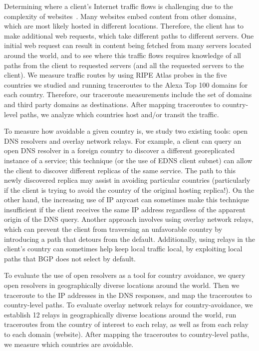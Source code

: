 Determining where a client's Internet traffic flows is challenging due to the
 complexity of websites~\cite{butkiewicz2011understanding}.  Many
websites embed content from other domains, which are most likely
hosted in different locations.  Therefore, the client has to make
additional web requests, which take different paths to different servers.  One initial web
request can result in content being fetched from many servers located
around the world, and to see where this traffic flows requires knowledge
of all paths from the client to requested servers (and all the requested
servers to the client).  We measure traffic routes by using RIPE 
Atlas probes in the five countries we studied and running traceroutes to 
the Alexa Top 100 domains for each country.  Therefore, our traceroute measurements include the 
set of domains and third party domains as destinations.  After mapping 
traceroutes to country-level paths, we analyze which 
countries host and/or transit the traffic.

To measure how avoidable a given country is, we study two existing tools: open DNS resolvers 
and overlay network relays. For
example, a client can query an open DNS resolver in a foreign country to
discover a different georeplicated instance of a service; this technique
(or the use of EDNS client subnet) can allow the client to discover
different replicas of the same service. The path to this newly
discovered replica may assist in avoiding particular countries
(particularly if the client is trying to avoid the country of the
original hosting replica!).  On the other hand, the increasing use of IP anycast \cite{cicalese2015characterizing} can
sometimes make this technique insufficient if the client
receives the same IP address regardless of the apparent origin of the
DNS query.  Another approach involves using overlay network relays, which can
prevent the client from traversing an unfavorable country by introducing
a path that detours from the default. Additionally, using
relays in the client's country can sometimes help keep local traffic
local, by exploiting local paths that BGP does not select by default.

To evaluate the use of open resolvers as a tool for country avoidance, we
query open resolvers in geographically diverse locations around the world.  Then we traceroute 
to the IP addresses in the DNS responses, and map the traceroutes to country-level paths.  To evaluate 
overlay network relays for country-avoidance, we establish 12 relays in geographically 
diverse locations around the world, run traceroutes from the country of interest to 
each relay, as well as from each relay to each domain (website).  After mapping 
the traceroutes to country-level paths, we measure which countries are 
avoidable.

